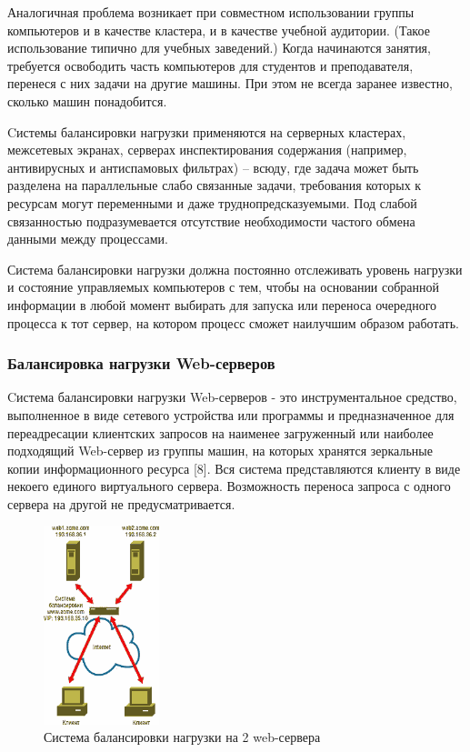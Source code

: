 Аналогичная проблема возникает при совместном использовании группы компьютеров и в качестве кластера, и в качестве учебной аудитории. (Такое использование типично для учебных заведений.) Когда начинаются занятия, требуется освободить часть компьютеров для студентов и преподавателя, перенеся с них задачи на другие машины. При этом не всегда заранее известно, сколько машин понадобится.

Cистемы балансировки нагрузки применяются на серверных кластерах, межсетевых экранах, серверах инспектирования содержания (например, антивирусных и антиспамовых фильтрах) – всюду, где задача может быть разделена на параллельные слабо связанные задачи, требования которых к ресурсам могут переменными и даже труднопредсказуемыми. Под слабой связанностью подразумевается отсутствие необходимости частого обмена данными между процессами.

Система балансировки нагрузки должна постоянно отслеживать уровень нагрузки и состояние управляемых компьютеров с тем, чтобы на основании собранной информации в любой момент выбирать для  запуска или переноса очередного процесса  к тот сервер, на котором процесс сможет наилучшим образом работать.

\subsubsection{Балансировка нагрузки Web-серверов}

Cистема балансировки нагрузки Web-серверов - это инструментальное средство, выполненное в виде сетевого  устройства или программы и предназначенное для переадресации клиентских запросов на наименее загруженный или наиболее подходящий Web-сервер из группы машин, на которых хранятся зеркальные копии информационного ресурса [8]. Вся система представляются клиенту в виде некоего единого виртуального сервера. Возможность переноса запроса с одного сервера на другой не предусматривается.

\begin{figure}
  \centering
  \includegraphics[width=0.3\textwidth]{images/balance-sys.png}
  \caption{Система балансировки нагрузки на 2 web-сервера}
\end{figure}

